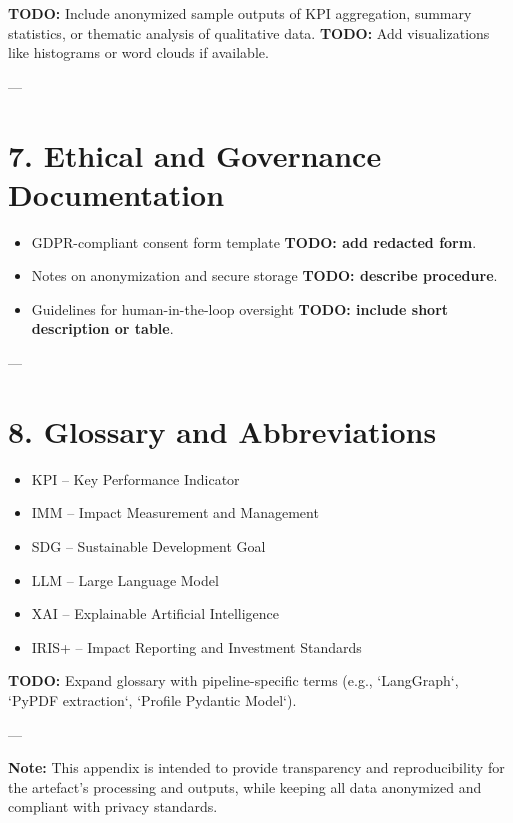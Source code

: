 \textbf{TODO:} Include anonymized sample outputs of KPI aggregation, summary statistics, or thematic analysis of qualitative data.  
\textbf{TODO:} Add visualizations like histograms or word clouds if available.

---

\section*{7. Ethical and Governance Documentation}

\begin{itemize}
    \item GDPR-compliant consent form template \textbf{TODO: add redacted form}.
    \item Notes on anonymization and secure storage \textbf{TODO: describe procedure}.
    \item Guidelines for human-in-the-loop oversight \textbf{TODO: include short description or table}.
\end{itemize}

---

\section*{8. Glossary and Abbreviations}

\begin{itemize}
    \item KPI – Key Performance Indicator  
    \item IMM – Impact Measurement and Management  
    \item SDG – Sustainable Development Goal  
    \item LLM – Large Language Model  
    \item XAI – Explainable Artificial Intelligence  
    \item IRIS+ – Impact Reporting and Investment Standards  
\end{itemize}

\textbf{TODO:} Expand glossary with pipeline-specific terms (e.g., `LangGraph`, `PyPDF extraction`, `Profile Pydantic Model`).

---

\textbf{Note:} This appendix is intended to provide transparency and reproducibility for the artefact’s processing and outputs, while keeping all data anonymized and compliant with privacy standards.  